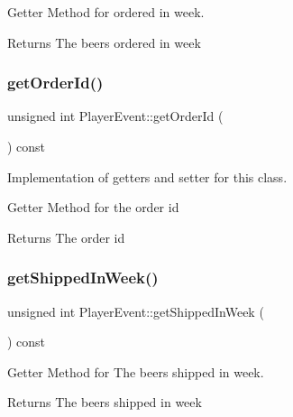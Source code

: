 Getter Method for ordered in week. 

\begin{DoxyReturn}{Returns}
The beers ordered in week 
\end{DoxyReturn}
\mbox{\label{classPlayerEvent_a9313159916c282a20bd69e27b6900679}} 
\subsubsection{\texorpdfstring{get\+Order\+Id()}{getOrderId()}}
{\footnotesize\ttfamily unsigned int Player\+Event\+::get\+Order\+Id (\begin{DoxyParamCaption}{ }\end{DoxyParamCaption}) const}



Implementation of getters and setter for this class. 

Getter Method for the order id \begin{DoxyReturn}{Returns}
The order id 
\end{DoxyReturn}
\mbox{\label{classPlayerEvent_ab541b87f6c0de2c990c2602b10d2b7cc}} 
\subsubsection{\texorpdfstring{get\+Shipped\+In\+Week()}{getShippedInWeek()}}
{\footnotesize\ttfamily unsigned int Player\+Event\+::get\+Shipped\+In\+Week (\begin{DoxyParamCaption}{ }\end{DoxyParamCaption}) const}



Getter Method for The beers shipped in week. 

\begin{DoxyReturn}{Returns}
The beers shipped in week 
\end{DoxyReturn}
\mbox{\label{classPlayerEvent_a341da1afa86a54b8b5f242a7fc071fdc}} 
